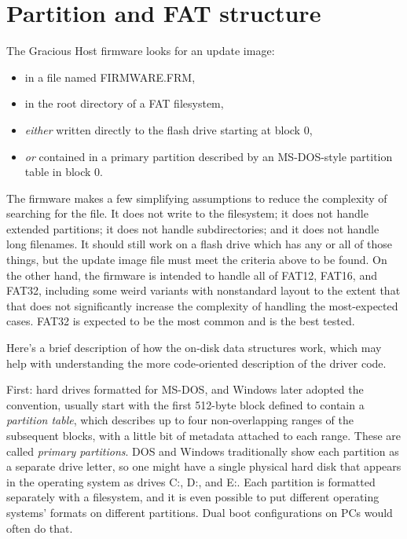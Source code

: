 \section{Partition and FAT structure}

The Gracious Host firmware looks for an update image:
\begin{itemize}
  \item in a file named FIRMWARE.FRM,
  \item in the root directory of a FAT filesystem,
  \item \emph{either} written directly to the flash drive starting at block
    0,
  \item \emph{or} contained in a primary partition described by an MS-DOS-style
    partition table in block 0.
\end{itemize}

The firmware makes a few simplifying assumptions to reduce the complexity of
searching for the file.  It does not write to the filesystem; it does not
handle extended partitions; it does not handle subdirectories; and it does
not handle long filenames.  It should still work on a flash drive which has
any or all of those things, but the update image file must meet the criteria
above to be found.  On the other hand, the firmware is intended to handle
all of FAT12, FAT16, and FAT32, including some weird variants with
nonstandard layout to the extent that that does not significantly increase
the complexity of handling the most-expected cases.  FAT32 is expected to be
the most common and is the best tested.

Here's a brief description of how the on-disk data structures work, which
may help with understanding the more code-oriented description of the driver
code.

First:  hard drives formatted for MS-DOS, and Windows later adopted the
convention, usually start with the first 512-byte block defined to contain a
\emph{partition table}, which describes up to four non-overlapping ranges of
the subsequent blocks, with a little bit of metadata attached to each range. 
These are called \emph{primary partitions}.  DOS and Windows traditionally
show each partition as a separate drive letter, so one might have a single
physical hard disk that appears in the operating system as drives C:, D:,
and E:.  Each partition is formatted separately with a filesystem, and it is
even possible to put different operating systems' formats on different
partitions.  Dual boot configurations on PCs would often do that.

